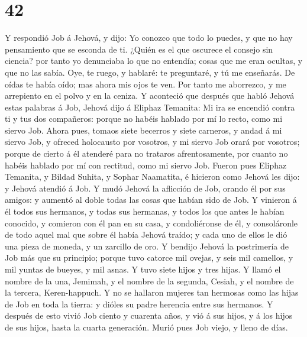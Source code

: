 \hypertarget{section-41}{%
\section{42}\label{section-41}}

 Y respondió Job á Jehová, y dijo:  Yo conozco
que todo lo puedes, y que no hay pensamiento que se esconda de ti.
 ¿Quién es el que oscurece el consejo sin ciencia? por tanto
yo denunciaba lo que no entendía; cosas que me eran ocultas, y que no
las sabía.  Oye, te ruego, y hablaré: te preguntaré, y tú me
enseñarás.  De oídas te había oído; mas ahora mis ojos te
ven.  Por tanto me aborrezco, y me arrepiento en el polvo y
en la ceniza.  Y aconteció que después que habló Jehová
estas palabras á Job, Jehová dijo á Eliphaz Temanita: Mi ira se encendió
contra ti y tus dos compañeros: porque no habéis hablado por mí lo
recto, como mi siervo Job.  Ahora pues, tomaos siete
becerros y siete carneros, y andad á mi siervo Job, y ofreced holocausto
por vosotros, y mi siervo Job orará por vosotros; porque de cierto á él
atenderé para no trataros afrentosamente, por cuanto no habéis hablado
por mí con rectitud, como mi siervo Job.  Fueron pues
Eliphaz Temanita, y Bildad Suhita, y Sophar Naamatita, é hicieron como
Jehová les dijo: y Jehová atendió á Job.  Y mudó Jehová la
aflicción de Job, orando él por sus amigos: y aumentó al doble todas las
cosas que habían sido de Job.  Y vinieron á él todos sus
hermanos, y todas sus hermanas, y todos los que antes le habían
conocido, y comieron con él pan en su casa, y condoliéronse de él, y
consoláronle de todo aquel mal que sobre él había Jehová traído; y cada
uno de ellos le dió una pieza de moneda, y un zarcillo de oro.
 Y bendijo Jehová la postrimería de Job más que su
principio; porque tuvo catorce mil ovejas, y seis mil camellos, y mil
yuntas de bueyes, y mil asnas.  Y tuvo siete hijos y tres
hijas.  Y llamó el nombre de la una, Jemimah, y el nombre
de la segunda, Cesiah, y el nombre de la tercera, Keren-happuch.
 Y no se hallaron mujeres tan hermosas como las hijas de
Job en toda la tierra: y dióles su padre herencia entre sus hermanos.
 Y después de esto vivió Job ciento y cuarenta años, y vió
á sus hijos, y á los hijos de sus hijos, hasta la cuarta generación.
 Murió pues Job viejo, y lleno de días.
